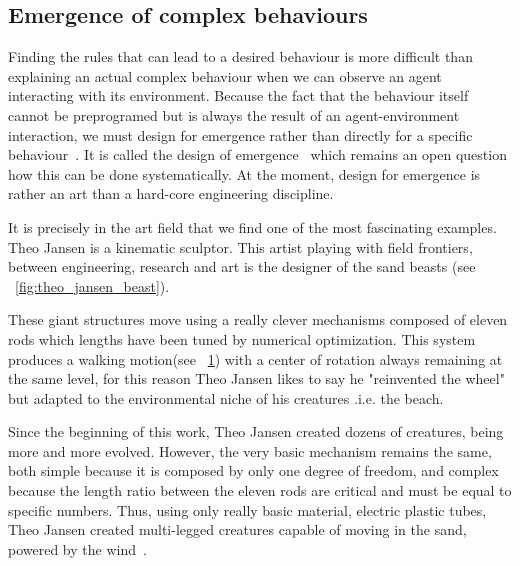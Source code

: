 \subsection{Emergence of complex behaviours} %

Finding the rules that can lead to a desired behaviour is more difficult than explaining an actual complex behaviour when we can observe an agent interacting with its environment. Because the fact that the behaviour itself cannot be preprogramed but is always the result of an agent-environment interaction, we must design for emergence rather than directly for a specific behaviour~\cite{Pfeifer06}. It is called the design of emergence~\cite{Steels1991emergence} which remains an open question how this can be done systematically. At the moment, design for emergence is rather an art than a hard-core engineering discipline.

It is precisely in the art field that we find one of the most fascinating examples. Theo Jansen is a kinematic sculptor. This artist playing with field frontiers, between engineering, research and art is the designer of the sand beasts (see \figurename~\ref{fig:theo_jansen_beast}).

\begin{figure}[tb]
\centering
    \newline
    \hfil
    \hfil
    \caption{}
    \label{fig:beast_mechanism}
\end{figure}


These giant structures move using a really clever mechanisms composed of eleven rods which lengths have been tuned by numerical optimization. This system produces a walking motion(see \figurename~\ref{fig:beast_mechanism}) with a center of rotation always remaining at the same level, for this reason Theo Jansen likes to say he "reinvented the wheel" but adapted to the environmental niche of his creatures .i.e. the beach.

Since the beginning of this work, Theo Jansen created dozens of creatures, being more and more evolved. However, the very basic mechanism remains the same, both simple because it is composed by only one degree of freedom, and complex because the length ratio between the eleven rods are critical and must be equal to specific numbers. Thus, using only really basic material, electric plastic tubes, Theo Jansen created multi-legged creatures capable of moving in the sand, powered by the wind~\cite{jansen2007theo}.




